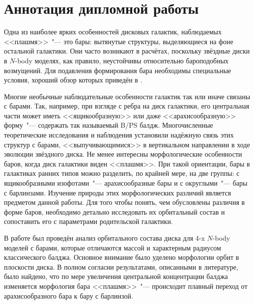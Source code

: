 \documentclass[draft]{trnotes}
\begin{document}
\section*{\sffamily Аннотация дипломной работы}
Одна из наиболее ярких особенностей дисковых галактик, наблюдаемых <<плашмя>>~"--- это бары:
вытянутые структуры, выделяющиеся на фоне остальной галактики.
Они часто возникают в расчётах, поскольку звёздные диски в $N$-body моделях, как правило, неустойчивы относительно бароподобных возмущений.
Для подавления формирования бара необходимы специальные условия, хороший обзор которых приведён 
в \citet{sellwood2019}.

Многие необычные наблюдательные особенности галактик так или иначе связаны с барами. 
Так, например, при взгляде с ребра на диск галактики, его центральная части может иметь 
<<ящикообразную>> или даже <<арахисообразную>> форму~"--- содержать так называемый B/PS балдж. 
Многочисленные теоретические исследования и наблюдения установили надёжную связь этих структур с барами, <<выпучивающимися>> в вертикальном направлении в ходе эволюции звёздного диска.
Не менее интересны морфологические особенности баров, когда диск галактики виден <<плашмя>>. При такой ориентации, бары в галактиках ранних типов можно разделить, по крайней мере, на две группы: с ящикообразными изофотами~"--- арахисообразные бары и с округлыми~"--- бары с барлинзами. 
Изучение природы этих морфологических различий является предметом данной работы.
Для того чтобы понять, чем обусловлены различия в форме баров, необходимо детально исследовать их орбитальный состав
и сопоставить его с параметрами родительской галактики.

В работе был проведён анализ орбитального состава диска для 4-x $N$-body моделей с барами, которые 
отличаются массой и характерным радиусом классического балджа. Основное внимание было уделено морфологии орбит в плоскости диска. 
В полном согласии результатами, описанными в литературе, было найдено, что по мере увеличения центральной концентрации балджа 
изменяется морфология бара <<плашмя>>~"--- происходит плавный переход от арахисообразного бара к бару с барлинзой.
\end{document}
